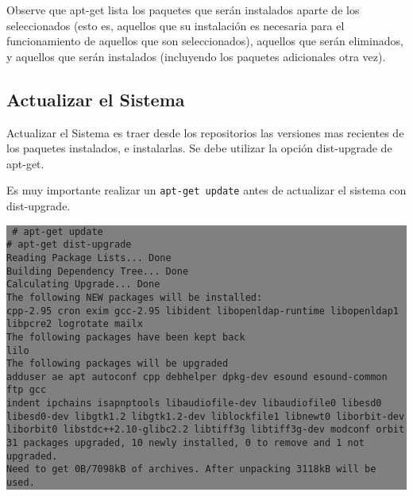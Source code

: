 \documentclass[12pt]{article}
\begin{document}
Observe que apt-get lista los paquetes que serán instalados aparte de los seleccionados (esto es, aquellos que su instalación es necesaria para el funcionamiento de aquellos que son seleccionados), aquellos que serán eliminados, y aquellos que serán instalados (incluyendo los paquetes adicionales otra vez).

\subsection*{Actualizar el Sistema}

Actualizar el Sistema es traer desde los repositorios las versiones mas recientes de los paquetes instalados,
e instalarlas. Se debe utilizar la opción dist-upgrade de apt-get.

Es muy importante realizar un \texttt{apt-get update} antes de actualizar el sistema con dist-upgrade.

\colorbox{grey}{\parbox[t]{0.95\linewidth}{ \vspace*{0.5cm} {\tt
     \# apt-get update\\
     \# apt-get dist-upgrade\\
     Reading Package Lists... Done\\
     Building Dependency Tree... Done\\
     Calculating Upgrade... Done\\
     The following NEW packages will be installed:\\
       cpp-2.95 cron exim gcc-2.95 libident libopenldap-runtime libopenldap1\\
       libpcre2 logrotate mailx\\
     The following packages have been kept back\\
       lilo\\
     The following packages will be upgraded\\
       adduser ae apt autoconf cpp debhelper dpkg-dev esound esound-common ftp gcc\\
       indent ipchains isapnptools libaudiofile-dev libaudiofile0 libesd0\\
       libesd0-dev libgtk1.2 libgtk1.2-dev liblockfile1 libnewt0 liborbit-dev\\
       liborbit0 libstdc++2.10-glibc2.2 libtiff3g libtiff3g-dev modconf orbit\\
     31 packages upgraded, 10 newly installed, 0 to remove and 1 not upgraded.\\
     Need to get 0B/7098kB of archives. After unpacking 3118kB will be used.\\
 } \vspace*{0.5cm} } } 
\end{document}
